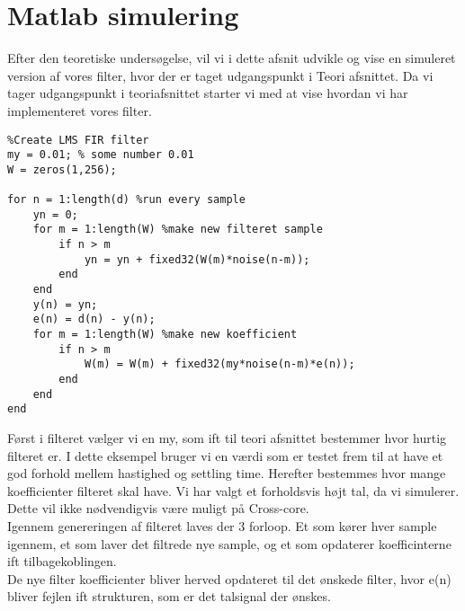 \graphicspath{{Chapters/Matlab/}}


\section{Matlab simulering}

Efter den teoretiske undersøgelse, vil vi i dette afsnit udvikle og vise en simuleret version af vores filter, hvor der er taget udgangspunkt i Teori afsnittet. Da vi tager udgangspunkt i teoriafsnittet starter vi med at vise hvordan vi har implementeret vores filter. 

\begin{lstlisting}
%Create LMS FIR filter
my = 0.01; % some number 0.01
W = zeros(1,256);

for n = 1:length(d) %run every sample 
    yn = 0;
    for m = 1:length(W) %make new filteret sample 
        if n > m
            yn = yn + fixed32(W(m)*noise(n-m));
        end
    end
    y(n) = yn;
    e(n) = d(n) - y(n);
    for m = 1:length(W) %make new koefficient  
        if n > m
            W(m) = W(m) + fixed32(my*noise(n-m)*e(n));
        end
    end
end
\end{lstlisting}

Først i filteret vælger vi en my, som ift til teori afsnittet bestemmer hvor hurtig filteret er. I dette eksempel bruger vi en værdi som er testet frem til at have et god forhold mellem hastighed og settling time. Herefter bestemmes hvor mange koefficienter filteret skal have. Vi har valgt et forholdsvis højt tal, da vi simulerer. Dette vil ikke nødvendigvis være muligt på Cross-core. \\

Igennem genereringen af filteret laves der 3 forloop. Et som kører hver sample igennem, et som laver det filtrede nye sample, og et som opdaterer koefficinterne ift tilbagekoblingen. \\
De nye filter koefficienter bliver herved opdateret til det ønskede filter, hvor e(n) bliver fejlen ift strukturen, som er det talsignal der ønskes. 